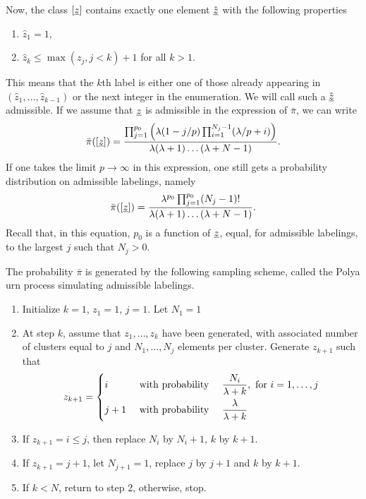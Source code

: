Now, the class $[{\underline{z}}]$ contains exactly one element $\hat {{\underline{z}}}$ with the following properties
\begin{enumerate}[label=$\bullet$, wide=0.5cm]
\item $\hat z_1 = 1$,
\item $\hat z_k \leq \max(z_j, j<k) + 1$ for all $k>1$.
\end{enumerate}
This means that the $k$th label is either one of those already appearing in $(\hat z_1, \ldots, \hat z_{k-1})$ or the next integer in the enumeration. We will call such a $\hat {{\underline{z}}}$ admissible. %
If we assume that ${\underline{z}}$ is admissible in the expression of $\bar \pi$, we can write
\[
\bar \pi([{\underline{z}}]) = \frac{\prod_{j=1}^{p_0} \left(\lambda (1-j/p) \prod_{i=1}^{N_j-1} (\lambda/p + i)\right)}{\lambda (\lambda+1) \ldots (\lambda+N-1)}.
\]
If one takes the limit $p\to\infty$ in this expression, one still gets a probability distribution on admissible labelings, namely
\begin{equation}
\label{eq:dp.classes}
\bar \pi([{\underline{z}}]) = \frac{\lambda^{p_0} \prod_{j=1}^{p_0} (N_j-1)! }{\lambda (\lambda+1) \ldots (\lambda+N-1)}.
\end{equation}
Recall that, in this equation, $p_0$ is a function of ${\underline{z}}$, equal, for admissible labelings, to the largest $j$ such that $N_j > 0$.


The probability $\bar \pi$ is generated by the following sampling scheme, called the Polya urn process simulating admissible labelings.

\begin{algorithm}
\label{alg:polya.urn}
\begin{enumerate}[label=\arabic*, wide=0.5cm]
\item Initialize $k=1$, $z_1=1$, $j=1$. Let $N_1 = 1$
\item At step $k$, assume that $z_1, \ldots,  z_k$ have been generated, with associated number of clusters equal to $j$ and $N_1, \dots, N_j$ elements per cluster. Generate $z_{k+1}$ such that
\begin{equation}
\label{eq:polya.urn}
z_{k+1} = 
\left\{
\begin{aligned}
&i&& \text{ with probability } && \frac{N_i}{\lambda + k}, \text{ for } i=1, \ldots, j\\
&j+1&& \text{ with probability } && \frac{\lambda}{\lambda + k}
\end{aligned}
\right.
\end{equation}
\item If $z_{k+1} = i \leq j$, then replace $N_i$ by $N_{i}+1$, $k$ by $k+1$.
\item If $z_{k+1} = j+1$, let $N_{j+1} = 1$, replace $j$ by $j+1$ and $k$ by $k+1$.
\item If $k<N$, return to step 2, otherwise, stop.
\end{enumerate}
\end{algorithm}

